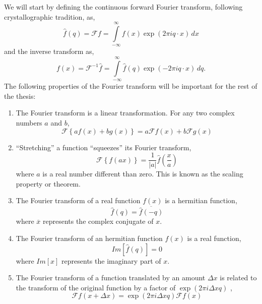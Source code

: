 We will start by defining the continuous forward Fourier transform, following crystallographic tradition, as,
\begin{equation}
\hat{f}(q) = \mathscr{F}f = \int \limits_{-\infty}^{\infty} 
f(x) \exp(2 \pi i q \cdot x) \, dx
\end{equation}
and the inverse transform as,
\begin{equation}
f(x) = \mathscr{F}^{-1}\hat{f} = \int \limits_{-\infty}^{\infty} 
\hat{f}(q) \exp(-2 \pi i q \cdot x) \, dq.
\end{equation}
The following properties of the Fourier transform will be important for the rest of the thesis:
\begin{enumerate}
\item The Fourier transform is a linear transformation. For any two complex
  numbers $a$ and $b$,
\begin{equation}
\mathscr{F}\left\{ a f(x) + b g(x)\right\} = a \mathscr{F}f(x) + b \mathscr{F}g(x)
\end{equation}

\item ``Stretching'' a function ``squeezes'' its Fourier  transform,
\begin{equation}
\mathscr{F}\left\{f(a x)\right\} = \frac{1}{|a|}\hat{f}(\frac{x}{a}) 
\end{equation}
where $a$ is a real number different than zero. This is known as the scaling
property or theorem.

\item The Fourier transform of a real function $f(x)$ is a hermitian function,  
\begin{equation}
\hat{f}(q) = \overline{\hat{f}(-q)}
\end{equation}
where $\overline{x}$ represents the complex conjugate of $x$.
\item The Fourier transform of an hermitian function $f(x)$ is a real function,
\begin{equation}
Im\left[\hat{f}(q)\right] = 0
\end{equation}
where $Im\left[x\right]$ represents the imaginary part of $x$.
\item The Fourier transform of a function translated by an amount $\Delta x$ is
  related to the transform of the original function by a factor of $\exp(2 \pi i
  \Delta x q)$ ,
  \begin{equation}
    \mathscr{F} f(x+\Delta x) = \exp(2 \pi i \Delta x q) \mathscr{F} f(x)
\end{equation}


\end{enumerate}
